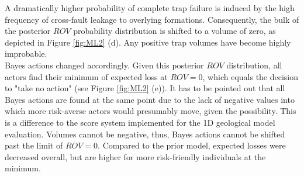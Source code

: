 		A dramatically higher probability of complete trap failure is induced by the high frequency of cross-fault leakage to overlying formations. Consequently, the bulk of the posterior $ROV$ probability distribution is shifted to a volume of zero, as depicted in Figure \ref{fig:ML2} (d). Any positive trap volumes have become highly improbable.\\
		Bayes actions changed accordingly. Given this posterior $ROV$ distribution, all actors find their minimum of expected loss at $ROV = 0$, which equals the decision to "take no action" (see Figure \ref{fig:ML2} (e)). It has to be pointed out that all Bayes actions are found at the same point due to the lack of negative values into which more risk-averse actors would presumably move, given the possibility. This is a difference to the score system implemented for the 1D geological model evaluation. Volumes cannot be negative, thus, Bayes actions cannot be shifted past the limit of $ROV = 0$. Compared to the prior model, expected losses were decreased overall, but are higher for more risk-friendly individuals at the minimum.
		
